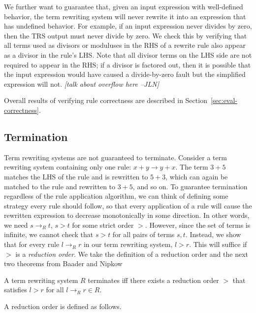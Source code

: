 \documentclass[sigplan,10pt,review,anonymous]{acmart}\settopmatter{printfolios=true,printccs=false,printacmref=false}
\newcommand{\jln}[1]{\textcolor{uwpurple}{\textit{[{#1} --JLN]}}}
\begin{document}
We further want to guarantee that, given an input expression with well-defined
behavior, the term rewriting system will never rewrite it into an expression that has
undefined behavior. For example, if an input expression never divides by zero, then the
TRS output must never divide by zero. We check this by
verifying that all terms used as divisors or moduluses in the RHS of a
rewrite rule also appear as a divisor in the rule's LHS. Note that all divisor
terms on the LHS side are not required to appear in the RHS; if a divisor is
factored out, then it is possible that the input expression would have caused a
divide-by-zero fault but the simplified expression will not. \jln{talk about
  overflow here}

Overall results of verifying rule correctness are described in Section~\ref{sec:eval-correctness}.

\subsection{Termination}

Term rewriting systems are not guaranteed to terminate. Consider a term
rewriting system containing only one rule: $x + y \rightarrow y + x$. The term
$3 + 5$ matches the LHS of the rule and is rewritten to $5 + 3$, which can again
be matched to the rule and rewritten to $3 + 5$, and so on. To guarantee
termination regardless of the rule application algorithm, we can think of defining some strategy
every rule should follow, so that every application of a rule will cause the rewritten expression to
decrease monotonically in some direction. In other
words, we need $s \rightarrow_R t$, $s > t$ for some strict order $>$. However, since
the set of terms is infinite, we cannot check that $s > t$ for all pairs of
terms $s, t$. Instead, we show that for every rule $l \rightarrow_R r$ in our
term rewriting system, $l > r$. This will suffice if $>$ is a \emph{reduction
  order}. We take the definition of a reduction order and the next two theorems from Baader and Nipkow~\cite{baader1999term}

\begin{theorem}\label{theorem:terminates}
A term rewriting system $R$ terminates iff there exists a reduction order $>$ that satisfies $l > r$ for all $l \rightarrow_R r \in R$.
\end{theorem}

A reduction order is defined as follows.
\end{document}
